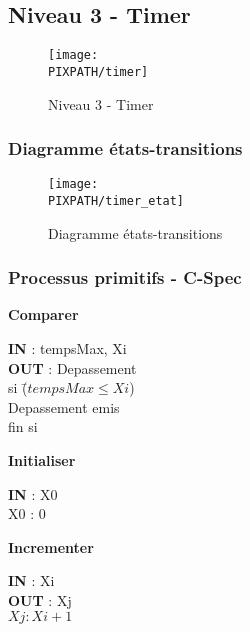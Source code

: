 \subsection{Niveau 3 - Timer}

\begin{center}
\begin{figure}[!h]
\texttt{[image: \\PIXPATH/timer]}
\caption{Niveau 3 - Timer}
\end{figure}
\end{center}


\subsubsection{Diagramme états-transitions}

\begin{center}
\begin{figure}[!h]
\texttt{[image: \\PIXPATH/timer\_etat]}
\caption{Diagramme états-transitions}
\end{figure}
\end{center}

\subsubsection{Processus primitifs - C-Spec}

\begin{description}
	
	\item \textbf{Comparer}
		\begin{tabbing} 
		\textbf{IN} : tempsMax, Xi \\
		\textbf{OUT} : Depassement\\
		si \=($tempsMax \leq Xi$) \\
			\>Depassement emis \\
		fin si 
		\end{tabbing}

	\item \textbf{Initialiser}
		\begin{tabbing} 
		\textbf{IN} : X0 \\
		X0 : 0
		\end{tabbing}

	\item \textbf{Incrementer}
		\begin{tabbing} 
		\textbf{IN} : Xi \\
		\textbf{OUT} : Xj \\
		$Xj : Xi + 1$
		\end{tabbing}


\end{description}

\vfill
\pagebreak

